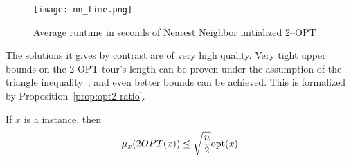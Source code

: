 \begin{figure}
    \begin{center}
        \texttt{[image: nn\_time.png]}
    \end{center}
    \caption{Average runtime in seconds of Nearest Neighbor initialized 2--OPT}
    \label{fig:2-opt-time}
\end{figure}

The solutions it gives by contrast are of very high quality. Very tight upper bounds on the 2-OPT tour's length can be proven under the assumption of the triangle inequality~\cite{opt2-ratio}, and even better bounds can be achieved. This is formalized by Proposition~\ref{prop:opt2-ratio}.

\begin{proposition}
    \label{prop:opt2-ratio}
    If \(x\) is a \TSP{} instance, then \[\mu_x(2OPT(x))\le \sqrt{n\over 2} \mathrm{opt}(x)\]
\end{proposition}